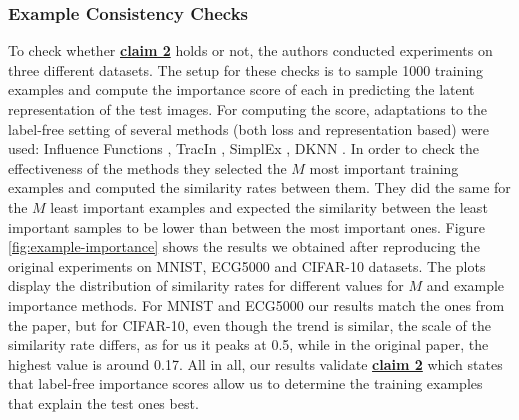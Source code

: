 \subsubsection{Example Consistency Checks}
To check whether \textbf{\hyperref[claim2]{claim 2}} holds or not, the authors conducted experiments on three different datasets. The setup for these checks is to sample 1000 training examples and compute the importance score of each in predicting the latent representation of the test images. For computing the score, adaptations to the label-free setting of several methods (both loss and representation based) were used: Influence Functions \cite{cook1980ch}\cite{koh}, TracIn \cite{pruthi}, SimplEx \cite{crabbe}, DKNN \cite{papernot}. In order to check the effectiveness of the methods they selected the $M$ most important training examples and computed the similarity rates between them. They did the same for the $M$ least important examples and expected the similarity between the least important samples to be lower than between the most important ones. Figure \ref{fig:example-importance} shows the results we obtained after reproducing the original experiments on MNIST, ECG5000 and CIFAR-10 datasets. The plots display the distribution of similarity rates for different values for $M$ and example importance methods. For MNIST and ECG5000 our results match the ones from the paper, but for CIFAR-10, even though the trend is similar, the scale of the similarity rate differs, as for us it peaks at 0.5, while in the original paper, the highest value is around 0.17. All in all, our results validate \textbf{\hyperref[claim2]{claim 2}} which states that label-free importance scores allow us to determine the training examples that explain the test ones best.
